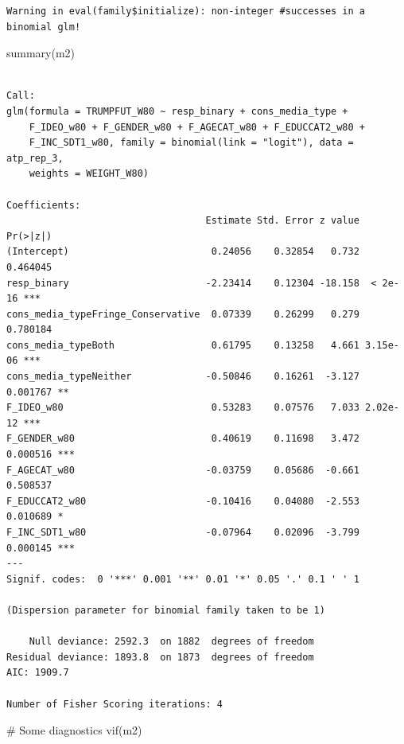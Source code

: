 \documentclass[
  letterpaper,
  DIV=11,
  numbers=noendperiod]{scrartcl}
\newenvironment{Shaded}{\begin{snugshade}}{\end{snugshade}}
\newcommand{\CommentTok}[1]{\textcolor[rgb]{0.37,0.37,0.37}{#1}}
\newcommand{\FunctionTok}[1]{\textcolor[rgb]{0.28,0.35,0.67}{#1}}
\newcommand{\NormalTok}[1]{\textcolor[rgb]{0.00,0.23,0.31}{#1}}
\begin{document}
\begin{verbatim}
Warning in eval(family$initialize): non-integer #successes in a binomial glm!
\end{verbatim}

\begin{Shaded}
\begin{Highlighting}[]
\FunctionTok{summary}\NormalTok{(m2) }
\end{Highlighting}
\end{Shaded}

\begin{verbatim}

Call:
glm(formula = TRUMPFUT_W80 ~ resp_binary + cons_media_type + 
    F_IDEO_w80 + F_GENDER_w80 + F_AGECAT_w80 + F_EDUCCAT2_w80 + 
    F_INC_SDT1_w80, family = binomial(link = "logit"), data = atp_rep_3, 
    weights = WEIGHT_W80)

Coefficients:
                                   Estimate Std. Error z value Pr(>|z|)    
(Intercept)                         0.24056    0.32854   0.732 0.464045    
resp_binary                        -2.23414    0.12304 -18.158  < 2e-16 ***
cons_media_typeFringe_Conservative  0.07339    0.26299   0.279 0.780184    
cons_media_typeBoth                 0.61795    0.13258   4.661 3.15e-06 ***
cons_media_typeNeither             -0.50846    0.16261  -3.127 0.001767 ** 
F_IDEO_w80                          0.53283    0.07576   7.033 2.02e-12 ***
F_GENDER_w80                        0.40619    0.11698   3.472 0.000516 ***
F_AGECAT_w80                       -0.03759    0.05686  -0.661 0.508537    
F_EDUCCAT2_w80                     -0.10416    0.04080  -2.553 0.010689 *  
F_INC_SDT1_w80                     -0.07964    0.02096  -3.799 0.000145 ***
---
Signif. codes:  0 '***' 0.001 '**' 0.01 '*' 0.05 '.' 0.1 ' ' 1

(Dispersion parameter for binomial family taken to be 1)

    Null deviance: 2592.3  on 1882  degrees of freedom
Residual deviance: 1893.8  on 1873  degrees of freedom
AIC: 1909.7

Number of Fisher Scoring iterations: 4
\end{verbatim}

\begin{Shaded}
\begin{Highlighting}[]
\CommentTok{\# Some diagnostics}
\FunctionTok{vif}\NormalTok{(m2)}
\end{Highlighting}
\end{Shaded}
\end{document}
